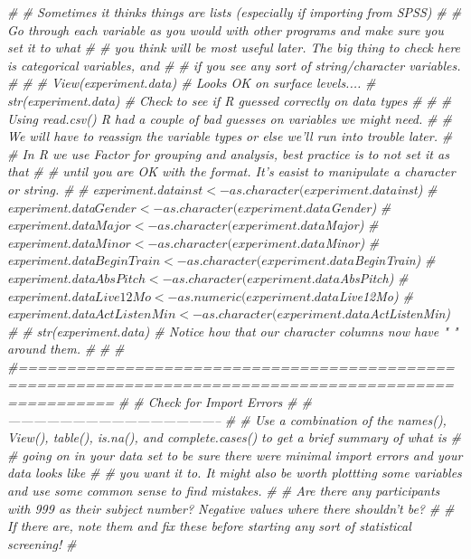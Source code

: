 \documentclass[]{book}
\newenvironment{Shaded}{\begin{snugshade}}{\end{snugshade}}
\newcommand{\CommentTok}[1]{\textcolor[rgb]{0.56,0.35,0.01}{\textit{#1}}}
\theoremstyle{definition}
\theoremstyle{definition}
\theoremstyle{definition}
\theoremstyle{remark}
\begin{document}
\begin{Shaded}
\begin{Highlighting}[]
\CommentTok{# # Sometimes it thinks things are lists (especially if importing from SPSS)}
\CommentTok{# # Go through each variable as you would with other programs and make sure you set it to what }
\CommentTok{# # you think will be most useful later. The big thing to check here is categorical variables, and}
\CommentTok{# # if you see any sort of string/character variables.}
\CommentTok{# }
\CommentTok{# # View(experiment.data) # Looks OK on surface levels.... }
\CommentTok{# str(experiment.data) # Check to see if R guessed correctly on data types}
\CommentTok{# }
\CommentTok{# # Using read.csv() R had a couple of bad guesses on variables we might need.}
\CommentTok{# # We will have to reassign the variable types or else we'll run into trouble later.}
\CommentTok{# # In R we use Factor for grouping and analysis, best practice is to not set it as that}
\CommentTok{# # until you are OK with the format. It's easist to manipulate a character or string.}
\CommentTok{# }
\CommentTok{# experiment.data$inst <- as.character(experiment.data$inst)}
\CommentTok{# experiment.data$Gender <- as.character(experiment.data$Gender)}
\CommentTok{# experiment.data$Major <- as.character(experiment.data$Major)}
\CommentTok{# experiment.data$Minor <- as.character(experiment.data$Minor)}
\CommentTok{# experiment.data$BeginTrain <- as.character(experiment.data$BeginTrain)}
\CommentTok{# experiment.data$AbsPitch <- as.character(experiment.data$AbsPitch)}
\CommentTok{# experiment.data$Live12Mo <- as.numeric(experiment.data$Live12Mo)}
\CommentTok{# experiment.data$ActListenMin <- as.character(experiment.data$ActListenMin)}
\CommentTok{# }
\CommentTok{# str(experiment.data) # Notice how that our character columns now have " " around them.}
\CommentTok{# }
\CommentTok{# }
\CommentTok{# #======================================================================================================}
\CommentTok{# # Check for Import Errors }
\CommentTok{# #--------------------------------------------------}
\CommentTok{# # Use a combination of the names(), View(), table(), is.na(), and complete.cases() to get a brief summary of what is }
\CommentTok{# # going on in your data set to be sure there were minimal import errors and your data looks like}
\CommentTok{# # you want it to. It might also be worth plottting some variables and use some common sense to find mistakes.}
\CommentTok{# # Are there any participants with 999 as their subject number? Negative values where there shouldn't be? }
\CommentTok{# # If there are, note them and fix these before starting any sort of statistical screening! }
\CommentTok{# }

\end{Highlighting}
\end{Shaded}
\end{document}
